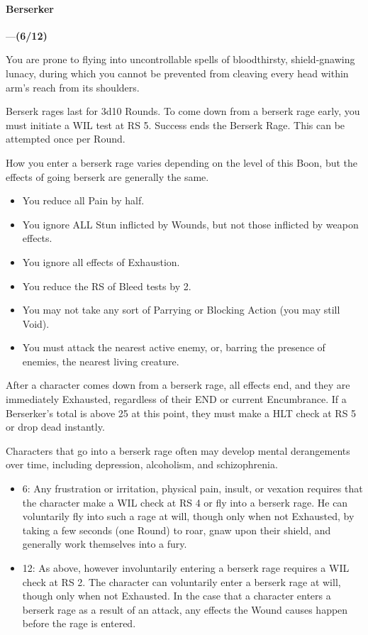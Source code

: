\documentclass[oneside,11pt,english]{book}
\begin{document}
\paragraph{\label{boon:Berserker}Berserker}---\quad \textbf{(6/12)}\par
You are prone to flying into uncontrollable spells of bloodthirsty, shield-gnawing lunacy, during which 
you cannot be prevented from cleaving every head within arm's reach from its shoulders. 

Berserk rages last for 3d10 Rounds. To come down from a berserk rage early, you must initiate a WIL 
test at RS 5. Success ends the Berserk Rage. This can be attempted once per Round. 

How you enter a berserk rage varies depending on the level of this Boon, but the effects of going berserk are generally the same. 
\begin{itemize}
\item You reduce all Pain by half. 
\item You ignore ALL Stun inflicted by Wounds, but not those inflicted by weapon effects. 
\item You ignore all effects of Exhaustion. 
\item You reduce the RS of Bleed tests by 2. 
\item You may not take any sort of Parrying or Blocking Action (you may still Void). 
\item You must attack the nearest active enemy, or, barring the presence of enemies, the nearest living 
creature. 
\end{itemize}
After a character comes down from a berserk rage, all effects end, and they are immediately Exhausted, 
regardless of their END or current Encumbrance. If a Berserker's  total is above 25 at this 
point, they must make a HLT check at RS 5 or drop dead instantly. 


Characters that go into a berserk rage often may develop mental derangements over time, including 
depression, alcoholism, and schizophrenia. 
\begin{itemize}
\item 6: Any frustration or irritation, physical pain, insult, or vexation requires that the character make a WIL check at RS 4 or fly into a berserk rage. He can voluntarily fly into such a rage at will, though only when not Exhausted, by taking a few seconds (one Round) to roar, gnaw upon their shield, and generally work 
themselves into a fury.
\item 12: As above, however involuntarily entering a berserk rage requires a WIL check at RS 2. The character can voluntarily enter a berserk rage at will, though only when not Exhausted. In the case that a character enters a berserk rage as a result of an attack, any effects the Wound causes happen before the rage is entered.
\end{itemize}
\end{document}
